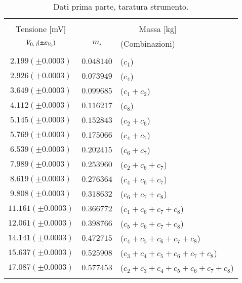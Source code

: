 \begin{table}
    \footnotesize
    \centering
    \caption{Dati prima parte, taratura strumento.}
    \label{table:p1}
    \begin{tabular}{ccl}
        \hline\hline\\[-1.5ex]
        Tensione [mV]       & \multicolumn{2}{c}{Massa [kg]}                         \\[+0.5ex]
        $V_{0,~i}(\pm\varepsilon_{V_0})$ & $m_i$      &  (Combinazioni)                  \\[+0.5ex] \hline \\[-1.5ex]
        $ 2.199(\pm0.0003)$          & $0.048140$ &  ($c_1$)                         \\[+0.5ex]
        $ 2.926(\pm0.0003)$          & $0.073949$ &  ($c_4$)                         \\[+0.5ex]
        $ 3.649(\pm0.0003)$          & $0.099685$ &  ($c_1+c_2$)                     \\[+0.5ex]
        $ 4.112(\pm0.0003)$          & $0.116217$ &  ($c_8$)                         \\[+0.5ex]
        $ 5.145(\pm0.0003)$          & $0.152843$ &  ($c_2+c_6$)                     \\[+0.5ex]
        $ 5.769(\pm0.0003)$          & $0.175066$ &  ($c_4+c_7$)                     \\[+0.5ex]
        $ 6.539(\pm0.0003)$          & $0.202415$ &  ($c_6+c_7$)                     \\[+0.5ex]
        $ 7.989(\pm0.0003)$          & $0.253960$ &  ($c_2+c_6+c_7$)                 \\[+0.5ex]
        $ 8.619(\pm0.0003)$          & $0.276364$ &  ($c_4+c_6+c_7$)                 \\[+0.5ex]
        $ 9.808(\pm0.0003)$          & $0.318632$ &  ($c_6+c_7+c_8$)                 \\[+0.5ex]
        $11.161(\pm0.0003)$          & $0.366772$ &  ($c_1+c_6+c_7+c_8$)             \\[+0.5ex]
        $12.061(\pm0.0003)$          & $0.398766$ &  ($c_5+c_6+c_7+c_8$)             \\[+0.5ex]
        $14.141(\pm0.0003)$          & $0.472715$ &  ($c_4+c_5+c_6+c_7+c_8$)         \\[+0.5ex]
        $15.637(\pm0.0003)$          & $0.525908$ &  ($c_3+c_4+c_5+c_6+c_7+c_8$)     \\[+0.5ex]
        $17.087(\pm0.0003)$          & $0.577453$ &  ($c_2+c_3+c_4+c_5+c_6+c_7+c_8$) \\[+0.5ex] \hline \\[-1.5ex]
    \end{tabular}
\end{table}